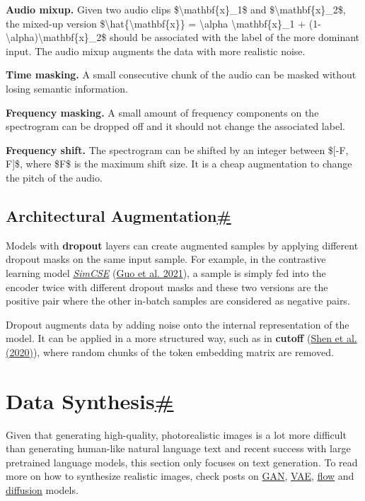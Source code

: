 \textbf{Audio mixup.} Given two audio clips \$\textbackslash mathbf\{x\}\_1\$ and \$\textbackslash mathbf\{x\}\_2\$, the mixed-up version \$\textbackslash hat\{\textbackslash mathbf\{x\}\} = \textbackslash alpha \textbackslash mathbf\{x\}\_1 + (1-\textbackslash alpha)\textbackslash mathbf\{x\}\_2\$ should be associated with the label of the more dominant input. The audio mixup augments the data with more realistic noise.

\textbf{Time masking.} A small consecutive chunk of the audio can be masked without losing semantic information.

\textbf{Frequency masking.} A small amount of frequency components on the spectrogram can be dropped off and it should not change the associated label.

\textbf{Frequency shift.} The spectrogram can be shifted by an integer between \${[}-F, F{]}\$, where \$F\$ is the maximum shift size. It is a cheap augmentation to change the pitch of the audio.

\subsection{\texorpdfstring{Architectural Augmentation\hyperref[architectural-augmentation]{\#}}{Architectural Augmentation\#}}\label{architectural-augmentation}

Models with \textbf{dropout} layers can create augmented samples by applying different dropout masks on the same input sample. For example, in the contrastive learning model \href{https://lilianweng.github.io/posts/2021-05-31-contrastive/\#simcse}{\emph{SimCSE}} (\href{https://arxiv.org/abs/2104.08821}{Guo et al. 2021}), a sample is simply fed into the encoder twice with different dropout masks and these two versions are the positive pair where the other in-batch samples are considered as negative pairs.

Dropout augments data by adding noise onto the internal representation of the model. It can be applied in a more structured way, such as in \textbf{cutoff} (\href{https://arxiv.org/abs/2009.13818}{Shen et al. (2020)}), where random chunks of the token embedding matrix are removed.

\section{\texorpdfstring{Data Synthesis\hyperref[data-synthesis]{\#}}{Data Synthesis\#}}\label{data-synthesis}

Given that generating high-quality, photorealistic images is a lot more difficult than generating human-like natural language text and recent success with large pretrained language models, this section only focuses on text generation. To read more on how to synthesize realistic images, check posts on \href{https://lilianweng.github.io/posts/2017-08-20-gan/}{GAN}, \href{https://lilianweng.github.io/posts/2018-08-12-vae/}{VAE}, \href{https://lilianweng.github.io/posts/2018-10-13-flow-models/}{flow} and \href{https://lilianweng.github.io/posts/2021-07-11-diffusion-models/}{diffusion} models.

